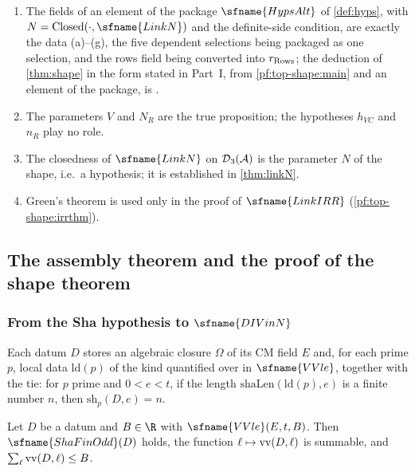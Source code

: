 \begin{remark}\label{pf:top-shape:rem:logic}
\begin{enumerate}[label=(\arabic*)]
\item The fields of an element of the package $\sfname{HypsAlt}$ of \cref{def:hyps}, with
$N=\topshapeCl(\cdot,\sfname{LinkN})$ and the definite-side condition, are exactly the data (a)--(g), the five
dependent selections being packaged as one selection, and the rows field being converted into $r_{\rm Rows}$; the
deduction of \cref{thm:shape} in the form stated in Part~I, from \cref{pf:top-shape:main} and an element of
the package, is .
\item The parameters $V$ and $N_R$ are the true proposition; the hypotheses $h_{VC}$ and $n_R$ play no role.
\item The closedness of $\sfname{LinkN}$ on $\mathcal{D}_3(\mathcal A)$ is the parameter $N$ of the shape, i.e.\
a hypothesis; it is established in \cref{thm:linkN}.
\item Green's theorem is used only in the proof of $\sfname{LinkIRR}$ (\cref{pf:top-shape:irrthm}).
\end{enumerate}
\end{remark}

\subsection{The assembly theorem and the proof of the shape theorem}\label{sec:pf:top-shape:assemblysec}

\subsubsection*{From the Sha hypothesis to $\sfname{DIVinN}$}

Each datum $D$ stores an algebraic closure $\Omega$ of its CM field $E$ and, for each prime $p$, local data
$\mathrm{ld}(p)$ of the kind quantified over in $\sfname{VVle}$, together with the tie: for $p$ prime and
$0<e<t$, if the length $\mathrm{shaLen}(\mathrm{ld}(p),e)$ is a finite number $n$, then $\mathrm{sh}_p(D,e)=n$.

\begin{lemma}\label{pf:top-shape:vvrecord}
Let $D$ be a datum and $B\in\R$ with $\sfname{VVle}(E,t,B)$. Then $\sfname{ShaFinOdd}(D)$ holds, the function
$\ell\mapsto\mathrm{vv}(D,\ell)$ is summable, and $\sum_\ell\mathrm{vv}(D,\ell)\le B$.
\formallabel{UpperTheory.Top.vvRecord}
\end{lemma}

